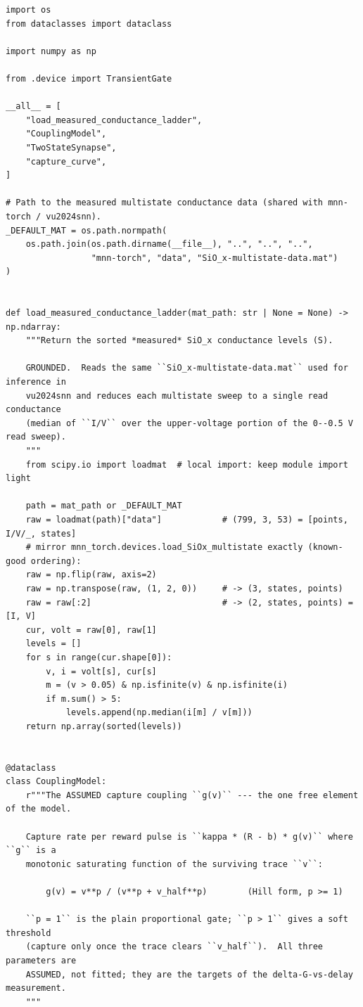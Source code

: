 \begin{lstlisting}[caption={mrl\_trace/capture.py},label={lst:siox-src-capture}]
import os
from dataclasses import dataclass

import numpy as np

from .device import TransientGate

__all__ = [
    "load_measured_conductance_ladder",
    "CouplingModel",
    "TwoStateSynapse",
    "capture_curve",
]

# Path to the measured multistate conductance data (shared with mnn-torch / vu2024snn).
_DEFAULT_MAT = os.path.normpath(
    os.path.join(os.path.dirname(__file__), "..", "..", "..",
                 "mnn-torch", "data", "SiO_x-multistate-data.mat")
)


def load_measured_conductance_ladder(mat_path: str | None = None) -> np.ndarray:
    """Return the sorted *measured* SiO_x conductance levels (S).

    GROUNDED.  Reads the same ``SiO_x-multistate-data.mat`` used for inference in
    vu2024snn and reduces each multistate sweep to a single read conductance
    (median of ``I/V`` over the upper-voltage portion of the 0--0.5 V read sweep).
    """
    from scipy.io import loadmat  # local import: keep module import light

    path = mat_path or _DEFAULT_MAT
    raw = loadmat(path)["data"]            # (799, 3, 53) = [points, I/V/_, states]
    # mirror mnn_torch.devices.load_SiOx_multistate exactly (known-good ordering):
    raw = np.flip(raw, axis=2)
    raw = np.transpose(raw, (1, 2, 0))     # -> (3, states, points)
    raw = raw[:2]                          # -> (2, states, points) = [I, V]
    cur, volt = raw[0], raw[1]
    levels = []
    for s in range(cur.shape[0]):
        v, i = volt[s], cur[s]
        m = (v > 0.05) & np.isfinite(v) & np.isfinite(i)
        if m.sum() > 5:
            levels.append(np.median(i[m] / v[m]))
    return np.array(sorted(levels))


@dataclass
class CouplingModel:
    r"""The ASSUMED capture coupling ``g(v)`` --- the one free element of the model.

    Capture rate per reward pulse is ``kappa * (R - b) * g(v)`` where ``g`` is a
    monotonic saturating function of the surviving trace ``v``:

        g(v) = v**p / (v**p + v_half**p)        (Hill form, p >= 1)

    ``p = 1`` is the plain proportional gate; ``p > 1`` gives a soft threshold
    (capture only once the trace clears ``v_half``).  All three parameters are
    ASSUMED, not fitted; they are the targets of the delta-G-vs-delay measurement.
    """


\end{lstlisting}
